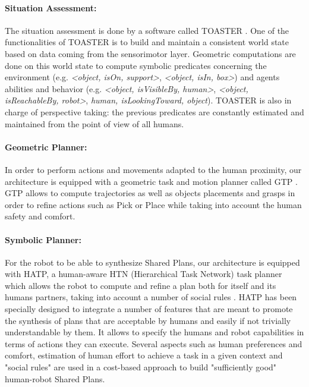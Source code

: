 \documentclass[english,a4paper,11pt,twoside]{StyleThese}
\begin{document}
\paragraph{Situation Assessment:}
The situation assessment is done by a software called TOASTER \cite{milliezThesis}. One of the functionalities of TOASTER is to build and maintain a consistent world state based on data coming from the sensorimotor layer. Geometric computations are done on this world state to compute symbolic predicates concerning the environment (e.g. \textit{<object, isOn, support>}, \textit{<object, isIn, box>}) and agents abilities and behavior (e.g. \textit{<object, isVisibleBy, human>}, \textit{<object, isReachableBy, robot>}, \textit{human, isLookingToward, object}). TOASTER is also in charge of perspective taking: the previous predicates are constantly estimated and maintained from the point of view of all humans.

\paragraph{Geometric Planner:}
In order to perform actions and movements adapted to the human proximity, our architecture is equipped with a geometric task and motion planner called GTP \cite{waldhart2016novel}. GTP allows to compute trajectories as well as objects placements and grasps in order to refine actions such as Pick or Place while taking into account the human safety and comfort.

\paragraph{Symbolic Planner:}
For the robot to be able to synthesize Shared Plans, our architecture is equipped with HATP, a human-aware HTN (Hierarchical Task Network) task planner which allows the robot to compute and refine a plan both for itself and its humans partners, taking into account a number of social rules \cite{Lallement2014hatp}.
HATP has been specially designed to integrate a number of features that are meant to promote the synthesis of plans that are acceptable by humans and easily if not trivially understandable by them. It allows to specify the humans and robot capabilities in terms of actions they can execute. Several aspects such as human preferences and comfort, estimation of human effort to achieve a task in a given context and "social rules" are used in a cost-based approach to build "sufficiently good" human-robot Shared Plans.
\end{document}
